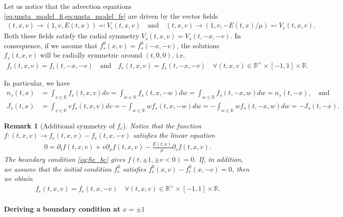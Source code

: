 \documentclass{article}
\newtheorem{remarque}{Remark}[section]
\numberwithin{equation}{section}
\newcommand{\R}{\mathbb{R}}
\newcommand{\vv}[1]{\begin{pmatrix} #1 \end{pmatrix}} %
\begin{document}
Let us notice that the advection equations \cref{eq:unsta_model_fi,eq:unsta_model_fe} are driven by the vector fields
\begin{align*}
	(t,x,v) \to (1, v, E(t,x)) \eqqcolon V_i(t,x,v) \quad \text{and} \quad (t,x,v) \to (1, v, -E(t,x)/\mu) \eqqcolon V_e(t,x,v).
\end{align*}
 Both these fields satisfy the radial symmetry $V_s(t,x,v) = V_s(t,-x,-v)$. In consequence, if we assume that $f_s^0(x,v)=f_s^0(-x,-v)$, the solutions $f_s(t,x,v)$ will be radially symmetric around $(t,0,0)$, i.e. 
 \begin{align*}
 	f_i(t,x,v) = f_i(t,-x,-v) \quad \text{and} \quad f_e(t,x,v) = f_e(t,-x,-v) \quad \forall (t,x,v) \in \R^+ \times [-1,1] \times \mathbb{R}.
 \end{align*}
 
 In particular, we have 
 \begin{align*}
 	n_s (t,x) &= \int_{v\in\mathbb{R}} f_s (t,x,v) dv =  \int_{w\in\mathbb{R}} f_s (t,x,-w) dw = \int_{w\in\mathbb{R}} f_s (t,-x,w) dw = n_s (t,-x),  \quad \text{and} \\
 	J_s (t,x) &= \int_{v\in\mathbb{R}} v f_s (t,x,v) dv =  - \int_{w\in\mathbb{R}} w f_s (t,x,-w) dw = - \int_{w\in\mathbb{R}} w f_s (t,-x,w) dw = - J_s (t,-x).
 \end{align*}
 
 \begin{remarque}[Additional symmetry of $f_e$] Notice that the function $f : (t,x,v) \to f_e(t,x,v) - f_e(t,x,-v)$ satisfies the linear equation 
 	 \begin{align*}
 	 	0 = \partial_t f (t,x,v) + v \partial_x f (t,x,v) - \frac{E(t,x)}{\mu} \partial_v f (t,x,v). %
 	 \end{align*}
 	 The boundary condition \cref{eq:fie_bc} gives $f(t,\pm 1, \pm v < 0) = 0$. If, in addition, we assume that the initial condition $f_e^0$ satisfies $f_e^0(x,v) - f_e^0(x,-v) = 0$, then we obtain 
 	 \begin{align}\label{eq:fe_sym_v}
 	 	f_e(t,x,v) = f_e(t,x,-v) \quad \forall (t,x,v) \in \R^+ \times [-1,1] \times \mathbb{R}.
 	 \end{align}
 \end{remarque}
 
 \paragraph{Deriving a boundary condition at $x=\pm 1$}
 
\end{document}
